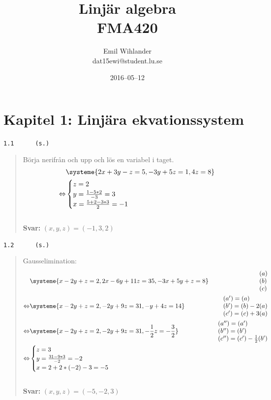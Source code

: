 \documentclass[a4paper]{article}
\title{Linjär algebra\\ FMA420}
\author{Emil Wihlander\\ dat15ewi@student.lu.se}
\date{2016--05--12}
\newcommand{\tskcol}[1]{\textcolor{tskcol}{#1}}
\begin{document}
 
\maketitle
\pagebreak
\section*{Kapitel 1: Linjära ekvationssystem}
\texttt{\tskcol{1.1~~~~~ (s.)}}
\begin{quotation}
	\noindent
	Börja nerifrån och upp och lös en variabel i taget.
	\begin{align*}
	&\systeme{
		2x+3y- z=5,
		  -3y+5z=1,
		      4z=8}  \\ \Leftrightarrow
	&\begin{cases}
	z=2 \\
	y=\frac{1-5*2}{-3}=3 \\
	x=\frac{5+2-3*3}{2}=-1
	\end{cases}
	\end{align*}
	\\
	\textbf{Svar:} $(x,y,z)=(-1,3,2)$
\end{quotation}

\texttt{\tskcol{1.2~~~~~ (s.)}}
\begin{quotation}
	\noindent
	Gausselimination:
	\begin{align*}
	&\systeme{
		  x-2y+  z=2,
		 2x-6y+11z=35,
		-3x+5y+  z=8}  
	&\begin{array}{l} 
		(a) \\ 
		(b) \\
		(c)
	\end{array} \\ \Leftrightarrow
	&\systeme{
		x-2y+ z=2,
		 -2y+9z=31,
		 - y+4z=14}  
	&\begin{array}{l} 
	(a')=(a) \\ 
	(b')=(b)-2(a) \\
	(c')=(c)+3(a)
	\end{array} \\ \Leftrightarrow
	&\systeme{
		x-2y+   z=2,
		 -2y+  9z=31,
		    -\frac{1}{2}z=-\frac{3}{2}}  
	&\begin{array}{l} 
	(a'')=(a') \\ 
	(b'')=(b') \\
	(c'')=(c')-\frac{1}{2}(b')
	\end{array} \\ \Leftrightarrow
	&\begin{cases}
	z=3 \\
	y=\frac{31-9*3}{-2} =-2\\
	x=2+2*(-2)-3=-5
	\end{cases}
	\end{align*}
	\\
	\textbf{Svar:} $(x,y,z)=(-5,-2,3)$
\end{quotation}
\end{document}
